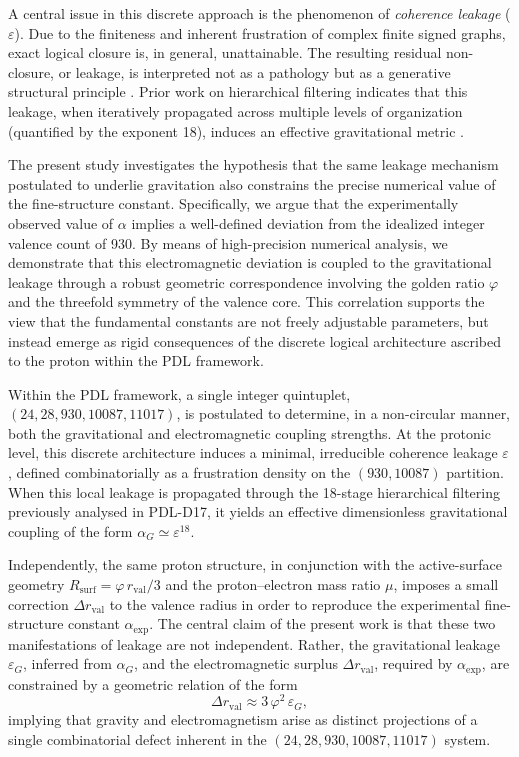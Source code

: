 \documentclass[11pt,a4paper]{article}
\newcommand{\eps}{\varepsilon}
\begin{document}
A central issue in this discrete approach is the phenomenon of \textit{coherence leakage} ($\eps$). Due to the finiteness and inherent frustration of complex finite signed graphs, exact logical closure is, in general, unattainable. The resulting residual non-closure, or leakage, is interpreted not as a pathology but as a generative structural principle \cite{Exponent_18_PDL_2026}. Prior work on hierarchical filtering indicates that this leakage, when iteratively propagated across multiple levels of organization (quantified by the exponent 18), induces an effective gravitational metric \cite{Exponent_18_PDL_2026, Topological_Reformulation_PDL_2026}.

The present study investigates the hypothesis that the same leakage mechanism postulated to underlie gravitation also constrains the precise numerical value of the fine-structure constant. Specifically, we argue that the experimentally observed value of \(\alpha\) implies a well-defined deviation from the idealized integer valence count of 930. By means of high-precision numerical analysis, we demonstrate that this electromagnetic deviation is coupled to the gravitational leakage through a robust geometric correspondence involving the golden ratio \(\varphi\) and the threefold symmetry of the valence core. This correlation supports the view that the fundamental constants are not freely adjustable parameters, but instead emerge as rigid consequences of the discrete logical architecture ascribed to the proton within the PDL framework.

Within the PDL framework, a single integer quintuplet,
\((24, 28, 930, 10087, 11017)\), is postulated to determine, in a non-circular manner, both the gravitational and electromagnetic coupling strengths. At the protonic level, this discrete architecture induces a minimal, irreducible coherence leakage \(\varepsilon\), defined combinatorially as a frustration density on the \((930, 10087)\) partition. When this local leakage is propagated through the 18-stage hierarchical filtering previously analysed in PDL-D17, it yields an effective dimensionless gravitational coupling of the form \(\alpha_G \simeq \varepsilon^{18}\).

Independently, the same proton structure, in conjunction with the active-surface geometry \(R_{\text{surf}} = \varphi\, r_{\text{val}}/3\) and the proton–electron mass ratio \(\mu\), imposes a small correction \(\Delta r_{\text{val}}\) to the valence radius in order to reproduce the experimental fine-structure constant \(\alpha_{\text{exp}}\). The central claim of the present work is that these two manifestations of leakage are not independent. Rather, the gravitational leakage \(\varepsilon_G\), inferred from \(\alpha_G\), and the electromagnetic surplus \(\Delta r_{\text{val}}\), required by \(\alpha_{\text{exp}}\), are constrained by a geometric relation of the form
\[
\Delta r_{\text{val}} \approx 3\,\varphi^2\,\varepsilon_G,
\]
implying that gravity and electromagnetism arise as distinct projections of a single combinatorial defect inherent in the \((24, 28, 930, 10087, 11017)\) system.
\end{document}
